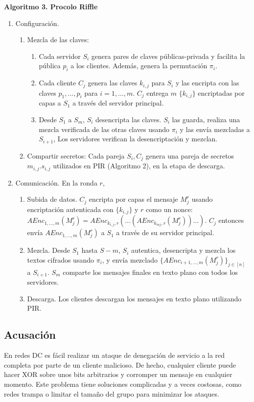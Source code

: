 \begin{enumerate}
\textbf{Algoritmo 3. Procolo Riffle}
\begin{enumerate}
	\item Configuración.
	\begin{enumerate}
		\item Mezcla de las claves:
		\begin{enumerate}
			\item Cada servidor $S_i$ genera pares de claves públicas-privada y facilita la pública $p_i$ a los clientes. Además, genera la permutación $\pi_i$.
			\item Cada cliente $C_j$ genera las claves $k_{i,j}$ para $S_i$ y las encripta con las claves $p_1,...,p_i$ para $i=1,...,m$. $C_j$ entrega $m$ $\{k_{i,j}\}$ encriptadas por capas a $S_1$ a través del servidor principal.
			\item Desde $S_1$ a $S_m$, $S_i$ desencripta las claves. $S_i$ las guarda, realiza una mezcla verificada de las otras claves usando $\pi_i$ y las envía mezcladas a $S_{i+1}$, Los servidores verifican la desencriptación y mezclan.
		\end{enumerate}
		\item Compartir secretos: Cada pareja $S_i,C_j$ genera una pareja de secretos $m_{i,j}.s_{i,j}$ utilizados en PIR (Algoritmo 2), en la etapa de descarga.
	\end{enumerate}
	\item Comunicación. En la ronda $r$,
	\begin{enumerate}
		\item Subida de datos. $C_j$ encripta por capas el mensaje $M_j ^r$ usando encriptación autenticada con $\{k_{i,j}\}$ y $r$ como un nonce: $AEnc_{1,...,m}(M_j ^r) = A Enc_{k_{i,j},r}(...(A Enc_{k_{mj},r}(M_j ^r))...)$. $C_j$ entonces envía $AEnc_{1,...,m}(M_j ^r)$ a $S_1$ a través de su servidor principal.
		\item Mezcla. Desde $S_1$ hasta $S-m$, $S_i$ autentica, desencripta y mezcla los textos cifrados usando $\pi_i$, y envía mezclado $\{AEnc_{i+1,...,m}(M_j ^r)\}_{j \in [n]}$ a $S_{i+1}$. $S_m$ comparte los mensajes finales en texto plano con todos los servidores.
		\item Descarga. Los clientes descargan los mensajes en texto plano utilizando PIR.
	\end{enumerate}
\end{enumerate}
	
\end{enumerate} 

\subsection{Acusación}
En redes DC es fácil realizar un ataque de denegación de servicio a la red completa por parte de un cliente malicioso. De hecho, cualquier cliente puede hacer XOR sobre unos bits arbitrarios y corromper un mensaje en cualquier momento. Este problema tiene soluciones complicadas y a veces costosas, como redes trampa o limitar el tamaño del grupo para minimizar los ataques.

